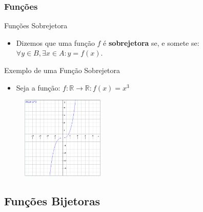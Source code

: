 \documentclass{beamer}
\begin{document}
\begin{frame}
\frametitle{Funções}

	\begin{block}{Funções Sobrejetora}
		\begin{itemize}
			\item<1-> Dizemos que uma função $f$ é \textbf{sobrejetora} se, e somete se:\\ $ \forall y \in B,\exists x \in A : y = f(x)$.
		\end{itemize}
	\end{block}
	
	\begin{block}{Exemplo de uma Função Sobrejetora}
		\begin{itemize}
			\item Seja a função: $f: \mathbb{R} \to \mathbb{R} : f(x) = x^3$
		\end{itemize}
	\end{block}
	\begin{figure}[!h]
			\begin{center}
			\includegraphics[width=0.35\textwidth]{Figures/f}
			\end{center}
	\end{figure}	
	
\end{frame}

\subsection{Funções Bijetoras}
\end{document}
